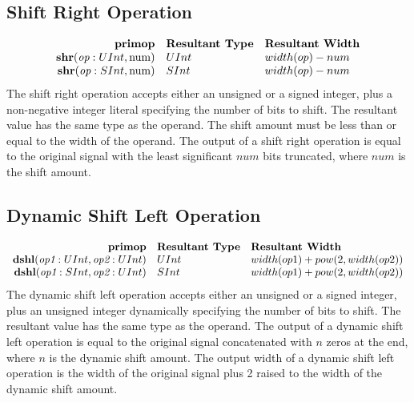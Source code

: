 \documentclass[10pt]{article}
\begin{document}
\subsection{Shift Right Operation}
\[
\begin{array}{rll}
\text{\bf primop} & \text{\bf Resultant Type} & \text{\bf Resultant Width} \\
\text{\bf shr}(\text{\em op}:UInt, \text{num})      & UInt & width(op) - num \\
\text{\bf shr}(\text{\em op}:SInt, \text{num})      & SInt & width(op) - num \\
\end{array}
\]
The shift right operation accepts either an unsigned or a signed integer, plus a non-negative integer literal specifying the number of bits to shift.
The resultant value has the same type as the operand.
The shift amount must be less than or equal to the width of the operand.
The output of a shift right operation is equal to the original signal with the least significant $num$ bits truncated, where $num$ is the shift amount.

\subsection{Dynamic Shift Left Operation}
\[
\begin{array}{rll}
\text{\bf primop} & \text{\bf Resultant Type} & \text{\bf Resultant Width} \\
\text{\bf dshl}(\text{\em op1}:UInt, \text{\em op2}:UInt)  & UInt & width(op1) + pow(2,width(op2)) \\
\text{\bf dshl}(\text{\em op1}:SInt, \text{\em op2}:UInt)  & SInt & width(op1) + pow(2,width(op2)) \\
\end{array}
\]
The dynamic shift left operation accepts either an unsigned or a signed integer, plus an unsigned integer dynamically specifying the number of bits to shift.
The resultant value has the same type as the operand.
The output of a dynamic shift left operation is equal to the original signal concatenated with $n$ zeros at the end, where $n$ is the dynamic shift amount.
The output width of a dynamic shift left operation is the width of the original signal plus 2 raised to the width of the dynamic shift amount.
\end{document}
